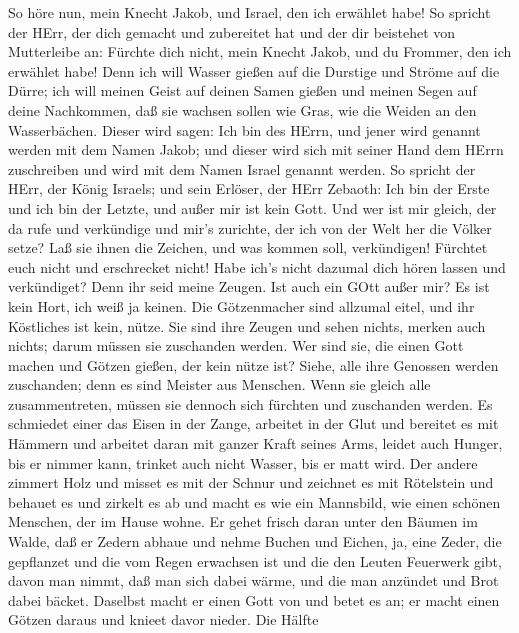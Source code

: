  So höre nun, mein Knecht Jakob, und Israel, den ich
erwählet habe!  So spricht der HErr, der dich gemacht und
zubereitet hat und der dir beistehet von Mutterleibe an: Fürchte dich
nicht, mein Knecht Jakob, und du Frommer, den ich erwählet habe!
 Denn ich will Wasser gießen auf die Durstige und Ströme auf
die Dürre; ich will meinen Geist auf deinen Samen gießen und meinen
Segen auf deine Nachkommen,  daß sie wachsen sollen wie
Gras, wie die Weiden an den Wasserbächen.  Dieser wird
sagen: Ich bin des HErrn, und jener wird genannt werden mit dem Namen
Jakob; und dieser wird sich mit seiner Hand dem HErrn zuschreiben und
wird mit dem Namen Israel genannt werden.  So spricht der
HErr, der König Israels; und sein Erlöser, der HErr Zebaoth: Ich bin der
Erste und ich bin der Letzte, und außer mir ist kein Gott. 
Und wer ist mir gleich, der da rufe und verkündige und mir's zurichte,
der ich von der Welt her die Völker setze? Laß sie ihnen die Zeichen,
und was kommen soll, verkündigen!  Fürchtet euch nicht und
erschrecket nicht! Habe ich's nicht dazumal dich hören lassen und
verkündiget? Denn ihr seid meine Zeugen. Ist auch ein GOtt außer mir? Es
ist kein Hort, ich weiß ja keinen.  Die Götzenmacher sind
allzumal eitel, und ihr Köstliches ist kein, nütze. Sie sind ihre Zeugen
und sehen nichts, merken auch nichts; darum müssen sie zuschanden
werden.  Wer sind sie, die einen Gott machen und Götzen
gießen, der kein nütze ist?  Siehe, alle ihre Genossen
werden zuschanden; denn es sind Meister aus Menschen. Wenn sie gleich
alle zusammentreten, müssen sie dennoch sich fürchten und zuschanden
werden.  Es schmiedet einer das Eisen in der Zange,
arbeitet in der Glut und bereitet es mit Hämmern und arbeitet daran mit
ganzer Kraft seines Arms, leidet auch Hunger, bis er nimmer kann,
trinket auch nicht Wasser, bis er matt wird.  Der andere
zimmert Holz und misset es mit der Schnur und zeichnet es mit Rötelstein
und behauet es und zirkelt es ab und macht es wie ein Mannsbild, wie
einen schönen Menschen, der im Hause wohne.  Er gehet
frisch daran unter den Bäumen im Walde, daß er Zedern abhaue und nehme
Buchen und Eichen, ja, eine Zeder, die gepflanzet und die vom Regen
erwachsen ist  und die den Leuten Feuerwerk gibt, davon man
nimmt, daß man sich dabei wärme, und die man anzündet und Brot dabei
bäcket. Daselbst macht er einen Gott von und betet es an; er macht einen
Götzen daraus und knieet davor nieder.  Die Hälfte
